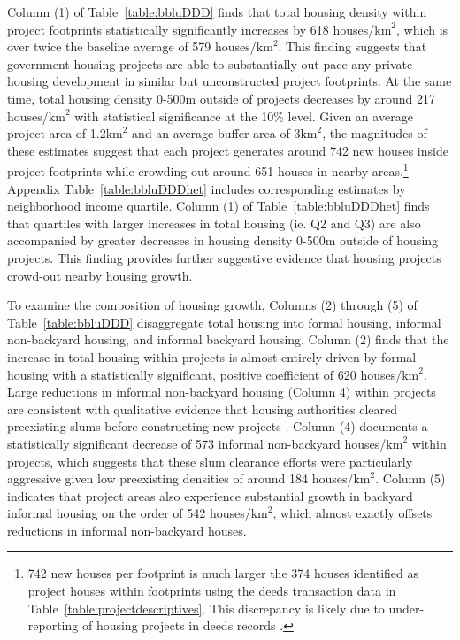 \documentclass[12pt]{article}
\begin{document}
Column (1) of Table~\ref{table:bbluDDD} finds that total housing density within project footprints statistically significantly increases by 618 houses/$\text{km}^{2}$, which is over twice the baseline average of 579 houses/$\text{km}^{2}$.  This finding suggests that government housing projects are able to substantially out-pace any private housing development in similar but unconstructed project footprints.  At the same time, total housing density 0-500m outside of projects decreases by around 217 houses/$\text{km}^{2}$ with statistical significance at the 10\% level.  Given an average project area of 1.2$\text{km}^{2}$ and an average buffer area of 3$\text{km}^{2}$, the magnitudes of these estimates suggest that each project generates around 742 new houses inside project footprints while crowding out around 651 houses in nearby areas.\footnote{742 new houses per footprint is much larger the 374 houses identified as project houses within footprints using the deeds transaction data in Table~\ref{table:projectdescriptives}.  This discrepancy is likely due to under-reporting of housing projects in deeds records \citep{seriq}.}  Appendix Table~\ref{table:bbluDDDhet} includes corresponding estimates by neighborhood income quartile.  Column (1) of Table~\ref{table:bbluDDDhet} finds that quartiles with larger increases in total housing (ie. Q2 and Q3) are also accompanied by greater decreases in housing density 0-500m outside of housing projects.  This finding provides further suggestive evidence that housing projects crowd-out nearby housing growth.


To examine the composition of housing growth, Columns (2) through (5) of Table~\ref{table:bbluDDD} disaggregate total housing into formal housing, informal non-backyard housing, and informal backyard housing.  Column (2) finds that the increase in total housing within projects is almost entirely driven by formal housing with a statistically significant, positive coefficient of 620 houses/$\text{km}^{2}$.  Large reductions in informal non-backyard housing (Column 4) within projects are consistent with qualitative evidence that housing authorities cleared preexisting slums before constructing new projects \citep{hofmeyr2008risk}.  Column (4) documents a statistically significant decrease of 573 informal non-backyard houses/$\text{km}^{2}$ within projects, which suggests that these slum clearance efforts were particularly aggressive given low preexisting densities of around 184 houses/$\text{km}^{2}$.  Column (5) indicates that project areas also experience substantial growth in backyard informal housing on the order of 542 houses/$\text{km}^{2}$, which almost exactly offsets reductions in informal non-backyard houses.    
\end{document}
